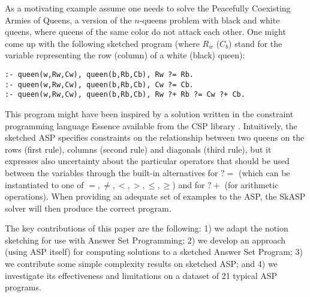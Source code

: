 As a motivating example assume 
one needs to solve %
the Peacefully Coexisting Armies of Queens, a version of the $n$-queens problem with black and white queens, where queens of the same color do not attack each other. 
One might come up with the following sketched program (where 
$R_w$ ($C_b$) stand for the variable representing the row (column) of a white (black) queen): 
\begin{lstlisting}[caption=Peacefully Coexisting Armies of Queens,label=lst:queens,basicstyle=\scriptsize\ttfamily]
:- queen(w,Rw,Cw), queen(b,Rb,Cb), Rw ?= Rb.
:- queen(w,Rw,Cw), queen(b,Rb,Cb), Cw ?= Cb.
:- queen(w,Rw,Cw), queen(b,Rb,Cb), Rw ?+ Rb ?= Cw ?+ Cb.
\end{lstlisting}
This program might have been inspired by a solution written in the constraint programming language Essence available from the CSP library \parencite{csplib:prob110}.  
Intuitively, the sketched ASP specifies constraints on the relationship between two queens on the rows (first rule), columns (second rule) and diagonals (third rule), %
but it expresses also uncertainty about the particular operators that should be used between the variables 
through the built-in alternatives for ${?}{=}$  (which can be instantiated to one of $=,\neq,<,>,\leq,\geq$) and for ${?}+$ (for arithmetic operations). 
When providing an adequate set of examples to the ASP, the SkASP solver will then produce the correct program.



The key contributions of this paper are the following: 1) we adapt the notion sketching for use with Answer Set Programming;
2) we develop an approach (using ASP itself) for computing solutions to a sketched Answer Set Program;
3) we contribute some simple complexity results on sketched ASP; 
and 4) we investigate its effectiveness and limitations on a dataset of 21 typical ASP programs. 





